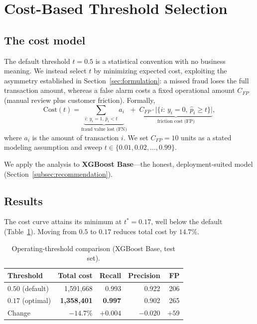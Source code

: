 \documentclass{article}
\begin{document}
\section{Cost-Based Threshold Selection}
\label{sec:cost}

\subsection{The cost model}
The default threshold $t = 0.5$ is a statistical convention with no
business meaning. We instead select $t$ by minimizing expected cost,
exploiting the asymmetry established in Section~\ref{sec:formulation}:
a missed fraud loses the full transaction amount, whereas a false alarm
costs a fixed operational amount $C_{FP}$ (manual review plus customer
friction). Formally,
\begin{equation}
\mathrm{Cost}(t) = \underbrace{\!\!\sum_{i:\, y_i=1,\, \hat p_i < t} \!\! a_i}_{\text{fraud value lost (FN)}}
\;+\; \underbrace{C_{FP}\cdot \bigl|\{i:\, y_i=0,\, \hat p_i \ge t\}\bigr|}_{\text{friction cost (FP)}},
\label{eq:cost}
\end{equation}
where $a_i$ is the amount of transaction $i$. We set $C_{FP} = 10$
units as a stated modeling assumption and sweep
$t \in \{0.01, 0.02, \ldots, 0.99\}$.

We apply the analysis to \textbf{XGBoost Base}---the honest,
deployment-suited model (Section~\ref{subsec:recommendation}).

\subsection{Results}
The cost curve attains its minimum at $t^{*} = 0.17$, well below the
default (Table~\ref{tab:cost}). Moving from $0.5$ to $0.17$ reduces
total cost by $14.7\%$.

\begin{table}[H]
\centering
\caption{Operating-threshold comparison (XGBoost Base, test set).}
\label{tab:cost}
\begin{tabular}{lrrrr}
\toprule
Threshold & Total cost & Recall & Precision & FP \\
\midrule
$0.50$ (default) & 1{,}591{,}668 & 0.993 & 0.922 & 206 \\
$0.17$ (optimal) & \textbf{1{,}358{,}401} & \textbf{0.997} & 0.902 & 265 \\
\midrule
Change & $-14.7\%$ & $+0.004$ & $-0.020$ & $+59$ \\
\bottomrule
\end{tabular}
\end{table}
\end{document}
